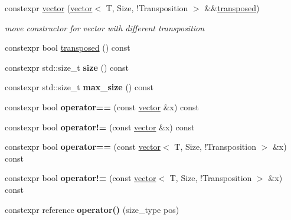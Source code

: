 \begin{DoxyCompactItemize}
constexpr \hyperlink{classnumpp_1_1vector_aa1ce55da7e9a2ccf1b1624a9f5347d5e}{vector} (\hyperlink{classnumpp_1_1vector}{vector}$<$ T, Size, !Transposition $>$ \&\&\hyperlink{classnumpp_1_1vector_a81037f5cce7bd02354efe8b967c191bf}{transposed})
\begin{DoxyCompactList}\small\item\em move constructor for vector with different transposition \end{DoxyCompactList}\item 
constexpr bool \hyperlink{classnumpp_1_1vector_a81037f5cce7bd02354efe8b967c191bf}{transposed} () const
\item 
\mbox{\label{classnumpp_1_1vector_a1e85f0d698ea1fe89382b7f6856e2e9c}} 
constexpr std\+::size\+\_\+t {\bfseries size} () const
\item 
\mbox{\label{classnumpp_1_1vector_a43212e8baa84331d115e520883329c1e}} 
constexpr std\+::size\+\_\+t {\bfseries max\+\_\+size} () const
\item 
\mbox{\label{classnumpp_1_1vector_a39ba91feb3daa1156002e4e9b58e8ee9}} 
constexpr bool {\bfseries operator==} (const \hyperlink{classnumpp_1_1vector}{vector} \&x) const
\item 
\mbox{\label{classnumpp_1_1vector_a79df8fa5b519885aaae962f2464c0fe6}} 
constexpr bool {\bfseries operator!=} (const \hyperlink{classnumpp_1_1vector}{vector} \&x) const
\item 
\mbox{\label{classnumpp_1_1vector_ac4a8575eecf2826d5fd3490ca795f007}} 
constexpr bool {\bfseries operator==} (const \hyperlink{classnumpp_1_1vector}{vector}$<$ T, Size, !Transposition $>$ \&x) const
\item 
\mbox{\label{classnumpp_1_1vector_a87f25e771d021a14b885f8b461f4bbff}} 
constexpr bool {\bfseries operator!=} (const \hyperlink{classnumpp_1_1vector}{vector}$<$ T, Size, !Transposition $>$ \&x) const
\item 
\mbox{\label{classnumpp_1_1vector_a8fe38963af92e47fbc3c60f5206f46a4}} 
constexpr reference {\bfseries operator()} (size\+\_\+type pos)
\item 

\end{DoxyCompactItemize}
